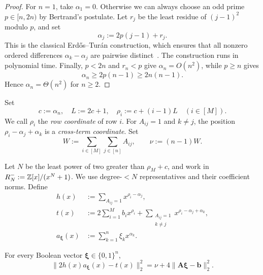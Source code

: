 \begin{proof}
For \(n=1\), take \(\alpha_1=0\).  Otherwise we can always choose an odd prime
\(p\in[n,2n)\) by Bertrand's
postulate.  Let \(r_j\) be the least residue of \((j-1)^2\) modulo
\(p\), and set
\[
 \alpha_j:=2p(j-1)+r_j.
\]
This is the classical Erd{\H{o}}s--Tur{\'a}n construction,
which ensures that all nonzero ordered differences \(\alpha_k-\alpha_j\) are
pairwise distinct~\cite{ErdosTuran41}.
The construction runs in polynomial time.  Finally,
\(p<2n\) and \(r_n<p\) give \(\alpha_n=O(n^2)\), while \(p\geq n\) gives
\[
\alpha_n\geq2p(n-1)\geq2n(n-1).
\]
Hence \(\alpha_n=\Theta(n^2)\) for \(n\geq2\).
\end{proof}

Set
\[
 c:=\alpha_n, \quad L:=2c+1,\quad \rho_i:=c+(i-1)L\quad(i\in[M]).
\]
We call \(\rho_i\) the \emph{row coordinate} of row \(i\).  For
\(A_{ij}=1\) and \(k\neq j\), the position
\(\rho_i-\alpha_j+\alpha_k\) is a
\emph{cross-term coordinate}.  Set
\[
 W:=\sum_{i\in[M]}\sum_{j\in[n]}A_{ij},
 \qquad
 \nu:=(n-1)W.
\]

Let \(N\) be the least power of two greater than \(\rho_M+c\), and
work in \(R_N^-:=\mathbb Z[x]/(x^N+1)\).  We use degree-\(<N\) representatives
and their coefficient norms.  Define
\begin{align*}
 h(x)&:=\sum_{A_{ij}=1}x^{\rho_i-\alpha_j},\\
 t(x)&:=2\sum_{i=1}^M b_i x^{\rho_i}
       +\sum_{\substack{A_{ij}=1\\k\neq j}}
          x^{\rho_i-\alpha_j+\alpha_k},\\
 a_{\boldsymbol\xi}(x)&:=\sum_{k=1}^n\xi_kx^{\alpha_k}.
\end{align*}

\begin{lemma}
\label{lem:boolean-identity}
For every Boolean vector
\(\boldsymbol\xi\in\{0,1\}^n\),
\[
 \|2h(x)a_{\boldsymbol\xi}(x)
       -t(x)\|_2^2
 =\nu+4\|\mathbf A\boldsymbol\xi-\mathbf b\|_2^2.
\]
\end{lemma}

